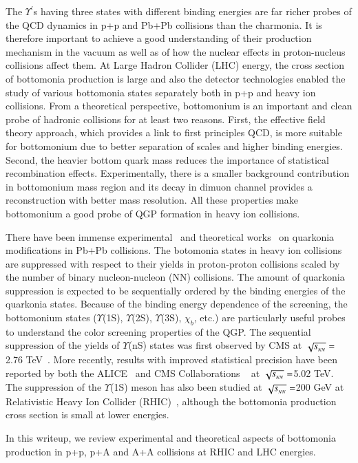 The $\Upsilon^{'}$s having three states with different binding
energies are far richer probes of the QCD dynamics in p+p and Pb+Pb collisions than
the charmonia.
It is therefore important to achieve a good understanding of their
production mechanism in the vacuum as well as of how the nuclear effects in proton-nucleus
collisions affect them.
  At Large Hadron Collider (LHC) energy, the cross section of bottomonia production is large and
also the detector technologies enabled the study of various bottomonia 
states separately both in p+p and heavy ion collisions.
From a theoretical perspective, bottomonium is an important and clean probe 
of hadronic collisions for at least two reasons. 
First, the effective field theory approach, which provides a link to first 
principles QCD, is more suitable for bottomonium due to better separation of 
scales and higher binding energies. Second, the heavier bottom quark 
mass reduces the importance of statistical recombination effects.
Experimentally, there is a smaller background contribution in bottomonium
mass region and its decay in dimuon channel provides a reconstruction with better
mass resolution. 
 All these properties make bottomonium a good probe of 
QGP formation in heavy ion collisions.


There have been immense
experimental~\cite{Sirunyan:2017isk,Sirunyan:2017lzi,CMS:2018zza,Acharya:2019iur,ALICE:2018wzm}
and theoretical works~\cite{Strickland:2011mw,Song:2011nu,Kumar:2014kfa,Kumar:2019xdj} on
quarkonia modifications in Pb+Pb collisions.
The botomonia states in heavy ion collisions are suppressed with respect to their yields
in proton-proton collisions scaled by the number of binary nucleon-nucleon
(NN) collisions.
The amount of quarkonia suppression is expected to be sequentially ordered by the binding
energies of the quarkonia states.
 Because of the binding energy
dependence of the screening, the bottomonium states ($\Upsilon$(1S), $\Upsilon$(2S),
$\Upsilon$(3S), $\chi_{b}$, etc.) are particularly useful probes to understand the color screening
properties of the QGP.
The sequential suppression of the yields of $\Upsilon$(nS) states was first observed by
CMS at $\sqrt{s_{_{NN}}} =$2.76 TeV~\cite{Chatrchyan:2011pe,Chatrchyan:2012lxa}. More recently, results with improved
statistical precision have been reported by both the ALICE~\cite{ALICE:2018wzm}
and CMS Collaborations ~\cite{Sirunyan:2017lzi,CMS:2018zza} at $\sqrt{s_{_{NN}}} =$5.02 TeV.
The suppression of the $\Upsilon$(1S)
meson has also been studied at $\sqrt{s_{_{NN}}} =$200 GeV at Relativistic Heavy Ion Collider (RHIC)~\cite{STAR:2013kwk}, although the
bottomonia production cross section is small at lower energies. 

In this writeup, we review experimental and theoretical aspects of bottomonia production in p+p, p+A
and A+A collisions at RHIC and LHC energies.







